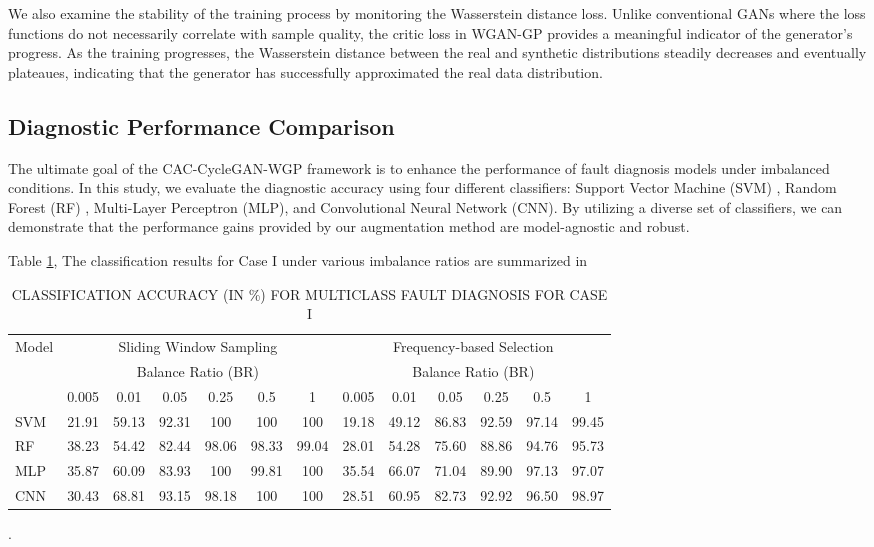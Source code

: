\documentclass[twocolumn]{IEEEtran}
\begin{document}
We also examine the stability of the training process by monitoring the Wasserstein distance loss. Unlike conventional GANs where the loss functions do not necessarily correlate with sample quality, the critic loss in WGAN-GP provides a meaningful indicator of the generator's progress. As the training progresses, the Wasserstein distance between the real and synthetic distributions steadily decreases and eventually plateaues, indicating that the generator has successfully approximated the real data distribution.

\subsection{Diagnostic Performance Comparison}
The ultimate goal of the CAC-CycleGAN-WGP framework is to enhance the performance of fault diagnosis models under imbalanced conditions. In this study, we evaluate the diagnostic accuracy using four different classifiers: Support Vector Machine (SVM) \cite{Cortes1995}, Random Forest (RF) \cite{Breiman2001}, Multi-Layer Perceptron (MLP), and Convolutional Neural Network (CNN). By utilizing a diverse set of classifiers, we can demonstrate that the performance gains provided by our augmentation method are model-agnostic and robust.

Table \ref{tab:accuracy_caseI}, The classification results for Case I under various imbalance ratios are summarized in \begin{table}[htbp]
\centering
\caption{CLASSIFICATION ACCURACY (IN \%) FOR MULTICLASS FAULT DIAGNOSIS FOR CASE I}
\label{tab:accuracy_caseI}
\begin{tabular}{lcccccccccccc}
\hline
\multirow{2}{*}{Model} & \multicolumn{6}{c}{Sliding Window Sampling} & \multicolumn{6}{c}{Frequency-based Selection} \\
 & \multicolumn{6}{c}{Balance Ratio (BR)} & \multicolumn{6}{c}{Balance Ratio (BR)} \\
 & 0.005 & 0.01 & 0.05 & 0.25 & 0.5 & 1 & 0.005 & 0.01 & 0.05 & 0.25 & 0.5 & 1 \\
\hline
SVM & 21.91 & 59.13 & 92.31 & 100 & 100 & 100 & 19.18 & 49.12 & 86.83 & 92.59 & 97.14 & 99.45 \\
RF & 38.23 & 54.42 & 82.44 & 98.06 & 98.33 & 99.04 & 28.01 & 54.28 & 75.60 & 88.86 & 94.76 & 95.73 \\
MLP & 35.87 & 60.09 & 83.93 & 100 & 99.81 & 100 & 35.54 & 66.07 & 71.04 & 89.90 & 97.13 & 97.07 \\
CNN & 30.43 & 68.81 & 93.15 & 98.18 & 100 & 100 & 28.51 & 60.95 & 82.73 & 92.92 & 96.50 & 98.97 \\
\hline
\end{tabular}
\end{table}. 
\end{document}
